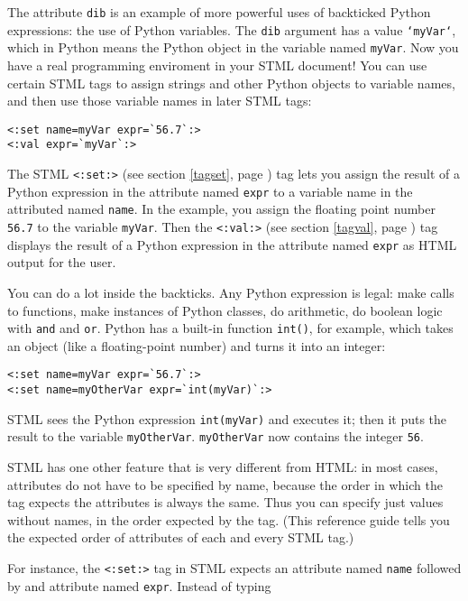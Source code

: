 \documentclass{manual}
\begin{document}
The attribute \texttt{dib} is an example of more powerful 
uses of backticked Python expressions: the use of Python variables.
The \texttt{dib} argument has a value \texttt{`myVar`}, which in Python means
the Python object in the variable named \texttt{myVar}. Now you have
a real programming enviroment in your STML document!  You can use certain
STML tags to assign strings and other Python objects to variable names,
and then use those variable names in later STML tags:

\begin{verbatim}
<:set name=myVar expr=`56.7`:>
<:val expr=`myVar`:>
\end{verbatim}


The STML \texttt{<:set:>} (see section \ref{tagset}, page
\pageref{tagset}) tag  
lets you assign the result of a Python expression in the attribute
named \texttt{expr} to a variable name in the attributed named \texttt{name}.
In the example, you assign the floating point number 
\texttt{56.7} to the variable \texttt{myVar}. Then the
\texttt{<:val:>} (see section \ref{tagval}, page
\pageref{tagval})
tag displays
the result of a Python expression in the attribute named \texttt{expr}
as HTML output for the user.

You can do a lot inside the backticks. Any Python expression is legal:
make calls to functions, make instances of Python classes, do arithmetic,
do boolean logic with \texttt{and} and \texttt{or}. 
Python has a built-in function \texttt{int()}, for example, which takes 
an object (like a floating-point number) and turns it into an integer: 

\begin{verbatim}
<:set name=myVar expr=`56.7`:>
<:set name=myOtherVar expr=`int(myVar)`:>
\end{verbatim}

STML sees the Python expression \texttt{int(myVar)} and executes it; 
then it puts the result to the variable \texttt{myOtherVar}.
\texttt{myOtherVar} now contains the integer \texttt{56}.

STML has one other feature that is very different from HTML: 
in most cases, attributes do not have to be specified by name,
because the order in which the tag expects the attributes is always the
same. Thus you can specify just values without names, in the order
expected by the tag. (This reference guide tells you the expected order
of attributes of each and every STML tag.)

For instance, the \texttt{<:set:>} tag in STML expects
an attribute named \texttt{name} followed by and attribute named
\texttt{expr}. Instead of typing 
\end{document}

